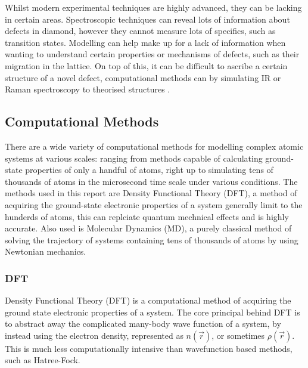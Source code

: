 \documentclass[10pt,a4paper,twocolumn,twoside]{extarticle}
\begin{document}
Whilst modern experimental techniques are highly advanced, they can be lacking in certain areas. Spectroscopic techniques can reveal lots of information about defects in diamond, however they cannot measure lots of specifics, such as transition states. Modelling can help make up for a lack of information when wanting to understand certain properties or mechanisms of defects, such as their migration in the lattice. On top of this, it can be difficult to ascribe a certain structure of a novel defect, computational methods can by simulating IR or Raman spectroscopy to theorised structures \cite{DFT_IR}. 

\subsection{Computational Methods}

There are a wide variety of computational methods for modelling complex atomic systems at various scales: ranging from methods capable of calculating ground-state properties of only a handful of atoms, right up to simulating tens of thousands of atoms in the microsecond time scale under various conditions. The methods used in this report are Density Functional Theory (DFT), a method of acquiring the ground-state electronic properties of a system generally limit to the hunderds of atoms, this can replciate quantum mechnical effects and is highly accurate. Also used is Molecular Dynamics (MD), a purely classical method of solving the trajectory of systems containing tens of thousands of atoms by using Newtonian mechanics.

\subsubsection{DFT}
Density Functional Theory (DFT) is a computational method of acquiring the ground state electronic properties of a system. 
The core principal behind DFT is to abstract away the complicated many-body wave function of a system, by instead using the electron density, represented as $n(\vec{r})$, or sometimes $\rho(\vec{r})$. This is much less computationally intensive than wavefunction based methods, such as Hatree-Fock. 
\end{document}
